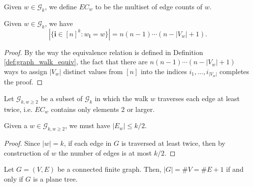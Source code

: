 \begin{definition}
  \label{def:edge_count_w}
  Given $w \in \mathcal{G}_k$, we define $EC_w$ to be the multiset of edge counts of $w$.
\end{definition}


\begin{lemma}
  \label{lem:lem_4.3}
  Given $w \in \mathcal{G}_k$, we have
  \[
   |\{ \mathbf{i} \in [n]^k : w_\mathbf{i} = w \}| = n (n-1) \cdots (n - |V_w| + 1).
  \]
\end{lemma}

\begin{proof}
  By the way the equivalence relation is defined in Definition \ref{def:graph_walk_equiv},
  the fact that there are $n (n - 1) \cdots (n -|V_w| + 1)$ ways to assign $|V_w|$ distinct values
  from $[n]$ into the indices $i_1,...,i_{|V_w|}$ completes the proof.
\end{proof}


\begin{definition}
  \label{def:g_k_ge_2}
  Let $\mathcal{G}_{k,w \geq 2}$ be a subset of $\mathcal{G}_k$ in which the walk $w$ traverses
  each edge at least twice, i.e. $EC_w$ contains only elements 2 or larger.
\end{definition}


\begin{lemma}
  \label{lem:edge_set_order_leq_k_over_two}
  Given a $w \in \mathcal{G}_{k,w \geq 2}$, we must have $|E_w| \leq k/2$.
\end{lemma}

\begin{proof}
  Since $|w| = k$, if each edge in $G$ is traversed at least twice, then by construction of $w$ the
   number of edges is at most $k/2$.
\end{proof}


\begin{proposition}
  \label{prop:vertex_edge_tree_equality}
  \notready
  Let $G=(V,E)$ be a connected finite graph. Then, $|G|=\#V=\#E+1$ if and only if $G$ is a plane tree.
\end{proposition}

